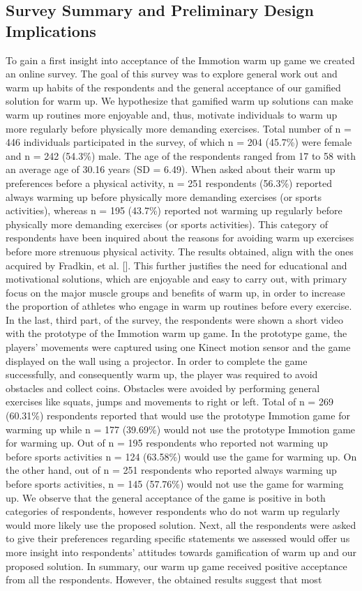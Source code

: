 \subsection{Survey Summary and Preliminary Design Implications}
To gain a first insight into acceptance of the Immotion warm up game we created an online survey. The goal of this survey was to explore general work out and warm up habits of the respondents and the general acceptance of our gamified solution for warm up. We hypothesize that gamified warm up solutions can make warm up routines more enjoyable and, thus, motivate individuals to warm up more regularly before physically more demanding exercises. Total number of n = 446 individuals participated in the survey, of which n = 204 (45.7\%) were female and n = 242 (54.3\%) male. The age of the respondents ranged from 17 to 58 with an average age of 30.16 years (SD = 6.49). When asked about their warm up preferences before a physical activity, n = 251 respondents (56.3\%) reported always warming up before physically more demanding exercises (or sports activities), whereas n = 195 (43.7\%) reported not warming up regularly before physically more demanding exercises (or sports activities). This category of respondents have been inquired about the reasons for avoiding warm up exercises before more strenuous physical activity. The results obtained, align with the ones acquired by Fradkin, et al. []. This further justifies the need for educational and motivational solutions, which are enjoyable and easy to carry out, with primary focus on the major muscle groups and benefits of warm up, in order to increase the proportion of athletes who engage in warm up routines before every exercise.\\In the last, third part, of the survey, the respondents were shown a short video with the prototype of the Immotion warm up game. In the prototype game, the players' movements were captured using one Kinect motion sensor and the game displayed on the wall using a projector. In order to complete the game successfully, and consequently warm up, the player was required to avoid obstacles and collect coins. Obstacles were avoided by performing general exercises like squats, jumps and movements to right or left. Total of n = 269 (60.31\%) respondents reported that would use the prototype Immotion game for warming up while n = 177 (39.69\%) would not use the prototype Immotion game for warming up. Out of n = 195 respondents who reported not warming up before sports activities n = 124 (63.58\%) would use the game for warming up. On the other hand, out of n = 251 respondents who reported always warming up before sports activities, n = 145 (57.76\%) would not use the game for warming up. We observe that the general acceptance of the game is positive in both categories of respondents, however respondents who do not warm up regularly would more likely use the proposed solution. Next, all the respondents were asked to give their preferences regarding specific statements we assessed would offer us more insight into respondents' attitudes towards gamification of warm up and our proposed solution. In summary, our warm up game received positive acceptance from all the respondents. However, the obtained results suggest that most 